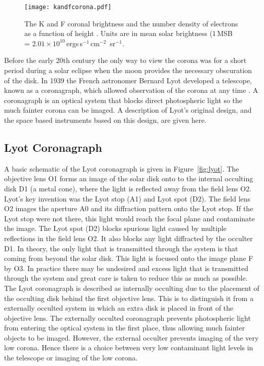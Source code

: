 \begin{figure}[!t]
\begin{center}
\texttt{[image: kandfcorona.pdf]}
\caption[Radial variation of the K and F corona]{The K and F coronal brightness and the number density of electrons as a function of height \citep{phillips1995}. Units are in mean solar brightness (1\,MSB = $2.01\times10^{10}$\,ergs\,s$^{-1}$\,cm$^{-2}$\, sr$^{-1}$.}
\label{fig:kandf}
\end{center}
\end{figure}
Before the early 20th century the only way to view the corona was for a short period during a solar eclipse when the moon provides the necessary obscuration of the disk. In 1939 the French astronomer Bernard Lyot developed a telescope, known as a coronagraph, which allowed observation of the corona at any time \citep{lyot1939}. A coronagraph is an optical system that blocks direct photospheric light so the much fainter corona can be imaged. A description of Lyot's original design, and the space based instruments based on this design, are given here.

\subsection{Lyot Coronagraph}\label{sec:22}
A basic schematic of the Lyot coronagraph is given in Figure~\ref{fig:lyot}. The objective lens O1 forms an image of the solar disk onto
to the internal occulting disk D1 (a metal cone), where the light is reflected away from the field lens O2. Lyot's key invention was the Lyot stop (A1) and Lyot spot (D2). The field lens O2 images the aperture A0 and its diffraction pattern onto the Lyot stop. If the Lyot stop were not there, this light would reach the focal plane and contaminate the image. The Lyot spot (D2) blocks spurious light caused by multiple reflections in the field lens O2. It also blocks any light diffracted by the occulter D1. In theory, the only light that is transmitted through the system is that coming from beyond the solar disk. This light is focused onto the image plane F by O3. In practice there may be undesired and excess light that is transmitted through the system and great care is taken to reduce this as much as possible. The Lyot coronagraph is described as internally occulting due to the placement of the occulting disk behind the first objective lens. This is to distinguish it from a externally occulted system in which an extra disk is placed in front of the objective lens. The externally occulted coronagraph prevents photospheric light from entering the optical system in the first place, thus allowing much fainter objects to be imaged. However, the external occulter prevents imaging of the very low corona. Hence there is a choice between very low contaminant light levels in the telescope or imaging of the low corona. 

